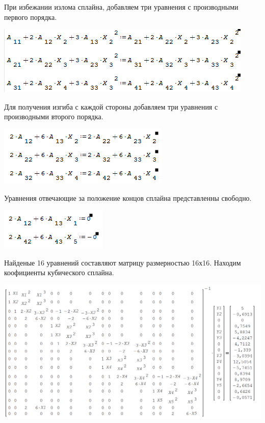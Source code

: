 \documentclass[russian,utf8,nocolumnxxxi,nocolumnxxxii]{eskdtext}
\begin{document}
\par
\newpage
\normalsize
При избежании излома сплайна, добавляем три уравнения с производными первого порядка.
\begin{center}\includegraphics[scale=0.8]{12.png}\end{center}
\par
\normalsize
Для получения изгиба с каждой стороны добавляем три уравнения с производными второго порядка.
\begin{center}\includegraphics[scale=0.8]{13.png}\end{center}
\par
\normalsize
Уравнения отвечающие за положение концов сплайна представленны свободно.
\begin{center}\includegraphics[scale=0.8]{14.png}\end{center}
\newpage
\par
\normalsize
Найденые 16 уравнений составляют матрицу размерностью 16х16. Находим коофициенты кубического сплайна.
\begin{center}\includegraphics[scale=0.4]{15.png}\end{center}
\end{document}
